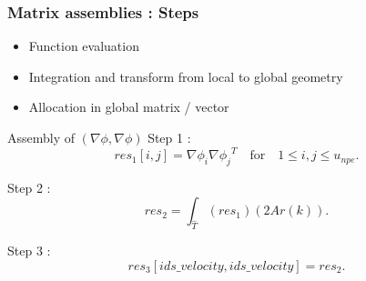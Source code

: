 \documentclass{beamer}
\begin{document}
\begin{frame}
\frametitle{Matrix assemblies : Steps}

\begin{itemize}

\item Function evaluation

\item Integration and transform from local to global geometry

\item Allocation in global matrix / vector

\end{itemize}

\begin{block}{Assembly of $(\nabla \phi, \nabla \phi)$}
Step 1 : 
\begin{equation}
res_1[i,j]= {\nabla \phi_i} {\nabla \phi_j}^T \quad \textrm{for} \quad 1 \leq i,j \leq u_{npe} \textrm{.}
\end{equation}

Step 2 : 
\begin{equation}
res_2 = \int_{\hat{T}} (res_1) (2 Ar(k)) \textrm{.}
\end{equation}

Step 3 : 
\begin{equation}
res_3[ids\_velocity,ids\_velocity]=res_2 \textrm{.}
\end{equation}

\end{block}

\end{frame}
\end{document}
